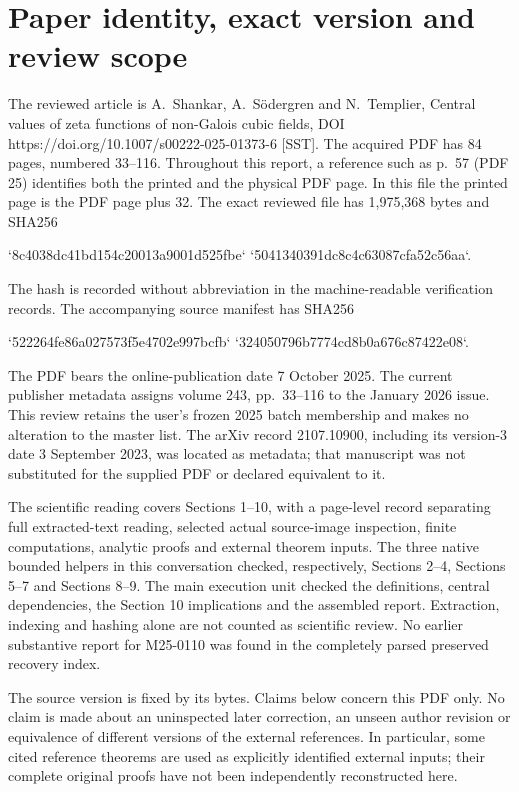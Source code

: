 \documentclass[10pt]{article}
\begin{document}
\section*{Paper identity, exact version and review scope}
The reviewed article is A. Shankar, A. Södergren and N. Templier, Central values of zeta functions of non-Galois cubic fields, DOI https://doi.org/10.1007/s00222-025-01373-6 [SST]. The acquired PDF has 84 pages, numbered 33–116. Throughout this report, a reference such as p. 57 (PDF 25) identifies both the printed and the physical PDF page. In this file the printed page is the PDF page plus 32. The exact reviewed file has 1,975,368 bytes and SHA256\par
`8c4038dc41bd154c20013a9001d525fbe`
`5041340391dc8c4c63087cfa52c56aa`.\par
The hash is recorded without abbreviation in the machine-readable verification records. The accompanying source manifest has SHA256\par
`522264fe86a027573f5e4702e997bcfb`
`324050796b7774cd8b0a676c87422e08`.\par
The PDF bears the online-publication date 7 October 2025. The current publisher metadata assigns volume 243, pp. 33–116 to the January 2026 issue. This review retains the user’s frozen 2025 batch membership and makes no alteration to the master list. The arXiv record 2107.10900, including its version-3 date 3 September 2023, was located as metadata; that manuscript was not substituted for the supplied PDF or declared equivalent to it.\par
The scientific reading covers Sections 1–10, with a page-level record separating full extracted-text reading, selected actual source-image inspection, finite computations, analytic proofs and external theorem inputs. The three native bounded helpers in this conversation checked, respectively, Sections 2–4, Sections 5–7 and Sections 8–9. The main execution unit checked the definitions, central dependencies, the Section 10 implications and the assembled report. Extraction, indexing and hashing alone are not counted as scientific review. No earlier substantive report for M25-0110 was found in the completely parsed preserved recovery index.\par
The source version is fixed by its bytes. Claims below concern this PDF only. No claim is made about an uninspected later correction, an unseen author revision or equivalence of different versions of the external references. In particular, some cited reference theorems are used as explicitly identified external inputs; their complete original proofs have not been independently reconstructed here.\par
\end{document}

